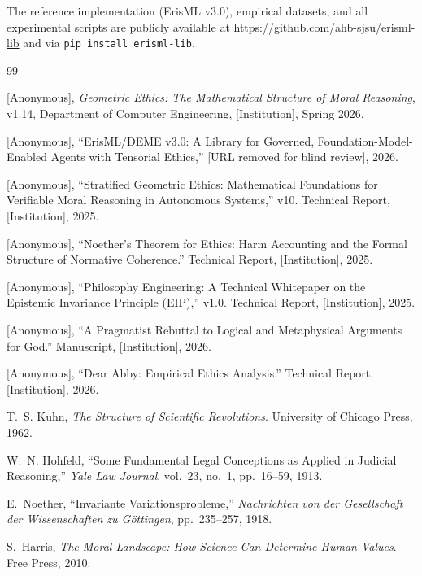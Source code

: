 \documentclass[12pt,letterpaper]{article}
\theoremstyle{definition}
\theoremstyle{remark}
\begin{document}
The reference implementation (ErisML v3.0), empirical datasets, and all experimental scripts are publicly available at \url{https://github.com/ahb-sjsu/erisml-lib} and via \texttt{pip install erisml-lib}.

\begin{thebibliography}{99}

[Anonymous], \emph{Geometric Ethics: The Mathematical Structure of Moral Reasoning}, v1.14, Department of Computer Engineering, [Institution], Spring 2026.

[Anonymous], ``ErisML/DEME v3.0: A Library for Governed, Foundation-Model-Enabled Agents with Tensorial Ethics,'' [URL removed for blind review], 2026.

[Anonymous], ``Stratified Geometric Ethics: Mathematical Foundations for Verifiable Moral Reasoning in Autonomous Systems,'' v10. Technical Report, [Institution], 2025.

[Anonymous], ``Noether's Theorem for Ethics: Harm Accounting and the Formal Structure of Normative Coherence.'' Technical Report, [Institution], 2025.

[Anonymous], ``Philosophy Engineering: A Technical Whitepaper on the Epistemic Invariance Principle (EIP),'' v1.0. Technical Report, [Institution], 2025.

[Anonymous], ``A Pragmatist Rebuttal to Logical and Metaphysical Arguments for God.'' Manuscript, [Institution], 2026.

[Anonymous], ``Dear Abby: Empirical Ethics Analysis.'' Technical Report, [Institution], 2026.

T.~S. Kuhn, \emph{The Structure of Scientific Revolutions}. University of Chicago Press, 1962.

W.~N. Hohfeld, ``Some Fundamental Legal Conceptions as Applied in Judicial Reasoning,'' \emph{Yale Law Journal}, vol.~23, no.~1, pp.~16--59, 1913.

E.~Noether, ``Invariante Variationsprobleme,'' \emph{Nachrichten von der Gesellschaft der Wissenschaften zu G\"{o}ttingen}, pp.~235--257, 1918.

S.~Harris, \emph{The Moral Landscape: How Science Can Determine Human Values}. Free Press, 2010.


\end{thebibliography}
\end{document}
